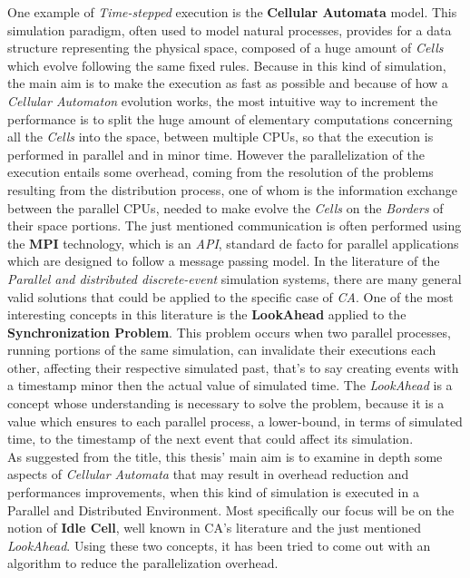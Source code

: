 \documentclass[12pt,a4paper,fleqn]{report}
\begin{document}
One example of \textit{Time-stepped } execution is the \textbf{Cellular Automata} model. This simulation paradigm, often used to model natural processes,  provides for a data structure representing the physical space, composed of a huge amount of \textit{Cells} which evolve following the same fixed rules. Because in this kind of simulation, the main aim is to make the execution as fast as possible and because of how a \textit{Cellular Automaton} evolution works, the most intuitive way to increment the performance is to split the huge amount of elementary computations concerning all the \textit{Cells} into the space, between multiple CPUs, so that the execution is performed in parallel and in minor time. However the parallelization of the execution entails some overhead, coming from the resolution of the problems resulting from the distribution process, one of whom is the information exchange between the parallel CPUs, needed to make evolve the \textit{Cells} on the \textit{Borders} of their space portions. The just mentioned communication is often performed using the \textbf{MPI} technology, which is an \textit{API}, standard de facto for parallel applications which are designed to follow a message passing model. In the literature of the \textit{Parallel and distributed discrete-event} simulation systems, there are many general valid solutions that could be applied to the specific case of \textit{CA}. One of the most interesting concepts in this literature is the \textbf{LookAhead} applied to the \textbf{Synchronization Problem}. This problem occurs when two parallel processes, running portions of the same simulation, can invalidate their executions each other, affecting their respective simulated past, that's to say creating events with a timestamp minor then the actual value of simulated time. The \textit{LookAhead} is a concept whose understanding is necessary to solve the problem, because it is a value which ensures to each parallel process, a lower-bound, in terms of simulated time, to the timestamp of the next event that could affect its simulation. \\
As suggested from the title, this thesis' main aim is to examine in depth some aspects of \textit{Cellular Automata} that may result in overhead reduction and performances improvements, when this kind of simulation is executed in a Parallel and Distributed Environment. Most specifically our focus will be on the notion of \textbf{Idle Cell}, well known in CA's literature and the just mentioned \textit{LookAhead}. Using these two concepts, it has been tried to come out with an algorithm to reduce the parallelization overhead.
\newpage
\end{document}

